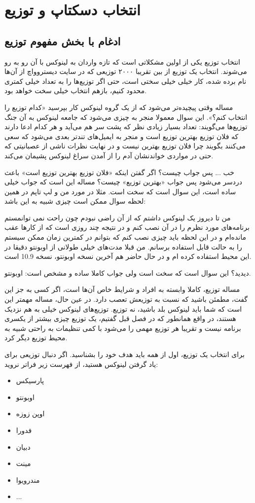 \section{انتخاب دسکتاپ و توزیع}
\subsection*{\textbf{ادغام با بخش مفهوم توزیع}}
انتخاب توزیع یکی از اولین مشکلاتی است که تازه واردان به لینوکس با آن رو به رو می‌شوند. انتخاب یک توزیع از بین تقریبا ۲۰۰۰ توزیعی که در سایت دیستروواچ از آن‌ها نام برده شده، کار خیلی خیلی سختی است، حتی اگر توزیع‌ها را به تعداد خیلی کمتری محدود کنیم، بازهم انتخاب خیلی سخت خواهد بود.

مساله وقتی پیچیده‌تر می‌شود که از یک گروه لینوکس کار بپرسید «کدام توزیع را انتخاب کنم؟». این سوال معمولا منجر به چیزی می‌شود که جامعه لینوکس به آن جنگ توزیع‌ها می‌گویند: تعداد بسیار زیادی نظر که پشت سر هم می‌آید و هر کدام ادعا دارند که فلان توزیع بهترین توزیع است و منجر به ایمیل‌های تندتر بعدی می‌شود که سعی می‌کنند بگویند چرا فلان توزیع بهترین نیست و در نهایت نظرات ناشی از عصبانیتی که حتی در مواردی خواندنشان آدم را از آمدن سراغ لینوکس پشیمان می‌کند.

خب ... پس جواب چیست؟ اگر گفتن اینکه «فلان توزیع بهترین توزیع است» باعث دردسر می‌شود پس جواب «بهترین توزیع» چیست؟ مساله این است که جواب خیلی ساده است، این سوال است که سخت است. مثلا در مورد من و لپ تاپم در همین لحظه سوال ممکن است چیزی شبیه به این باشد:
\begin{mybox}
من تا دیروز یک لینوکس داشتم که از آن راضی نبودم چون راحت نمی توانمستم برنامه‌های مورد نظرم را در آن نصب کنم و در نتیجه چند روزی است که از کارها عقب مانده‌ام و در این لحظه باید چیزی نصب کنم که بتوانم در کمترین زمان ممکن سیستم را به حالت قابل استفاده برسانم. من قبلا مدت‌های خیلی طولانی از اوبونتو دقیقا در این محیط استفاده کرده ام و در حال حاضر هم آخرین نسخه اوبونتو، نسخه 10.9 است.
\end{mybox}
دیدید؟ این سوال است که سخت است ولی جواب کاملا ساده و مشخص است: اوبونتو.

مساله توزیع، کاملا وابسته به افراد و شرایط خاص آن‌ها است، اگر کسی به جز این گفت، مطمئن باشید که نسبت به توزیعش تعصب دارد. در عین حال، مساله مهمتر این است که شما باید لینوکس بلد باشید، نه توزیع. توزیع‌های لینوکس خیلی به هم نزدیک هستند، در واقع همانطور که در فصل قبل گفتیم، یک توزیع چیزی بیشتر از یکسری برنامه نیست و تقریبا هر توزیع مهمی را می‌شود با کمی تنظیمات به راحتی شبیه به محیط توزیع دیگر کرد.

برای انتخاب یک توزیع، اول از همه باید هدف خود را بشناسید. اگر دنبال توزیعی برای یاد گرفتن لینوکس هستید، از فهرست زیر فراتر نروید:
\begin{itemize}
	\item پارسیکس
	\item اوبونتو
	\item اوپن زوزه
	\item فدورا
	\item دبیان
	\item مینت
	\item مندرویوا
	\item ...
\end{itemize}

